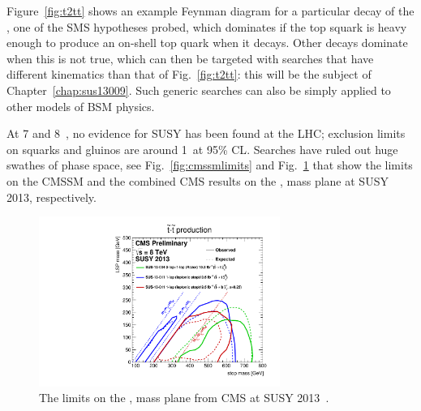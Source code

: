 Figure~\ref{fig:t2tt} shows an example Feynman diagram for a particular decay of the \sTop{}, 
one of the \ac{SMS} hypotheses probed, 
which dominates if the top squark is heavy enough to produce an on-shell top quark when it decays.
Other decays dominate when this is not true, which can then be targeted with searches that have different kinematics than that of Fig.~\ref{fig:t2tt}: this will be the subject of Chapter~\ref{chap:sus13009}.
Such generic searches can also be simply applied to other models of \ac{BSM} physics.


At 7 and 8~\TeV, no evidence for \ac{SUSY} has been found at the \ac{LHC};
exclusion limits on squarks and gluinos are around 1~\TeV at 95\% \ac{CL}.
Searches have ruled out huge swathes of phase space, see Fig.~\ref{fig:cmssmlimits} and Fig.~\ref{fig:susy2013stop} that show the limits on the \ac{CMSSM} and the combined \ac{CMS} results on the \sTop{}, \chiOneZero{} mass plane at SUSY 2013, respectively.

\begin{figure}[t!]
  \begin{center}
  \includegraphics[width=0.7\textwidth]{Figures/theory/SUSY2013T2ttT6.pdf}
  \caption{The limits on the \sTop{}, \chiOneZero mass plane from \ac{CMS} at SUSY 2013~\cite{tw:SUSY2013T2tt}.}
  \label{fig:susy2013stop}
  \end{center}
\end{figure}


